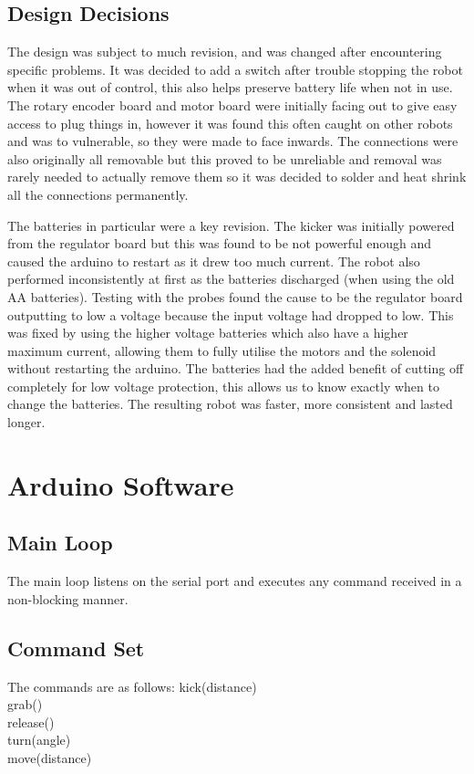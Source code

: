 \documentclass[a4paper]{article}
\begin{document}
\subsection{Design Decisions}
The design was subject to much revision, and was changed after encountering specific problems. It was decided to add a switch after trouble stopping the robot when it was out of control, this also helps preserve battery life when not in use. The rotary encoder board and motor board were initially facing out to give easy access to plug things in, however it was found this often caught on other robots and was to vulnerable, so they were made to face inwards. The connections were also originally all removable but this proved to be unreliable and removal was rarely needed to actually remove them so it was decided to solder and heat shrink all the connections permanently.

The batteries in particular were a key revision. The kicker was initially powered from the regulator board but this was found to be not powerful enough and caused the arduino to restart as it drew too much current. The robot also performed inconsistently at first as the batteries discharged (when using the old AA batteries). Testing with the probes found the cause to be the regulator board outputting to low a voltage because the input voltage had dropped to low. This was fixed by using the higher voltage batteries which also have a higher maximum current, allowing them to fully utilise the motors and the solenoid without restarting the arduino. The batteries had the added benefit of cutting off completely for low voltage protection, this allows us to know exactly when to change the batteries. The resulting robot was faster, more consistent and lasted longer. 

\section{Arduino Software}
\subsection{Main Loop}
The main loop listens on the serial port and executes any command received in a non-blocking manner. 
\subsection{Command Set}
The commands are as follows:
kick(distance)\\
grab()\\
release()\\
turn(angle)\\
move(distance)\\
\end{document}
